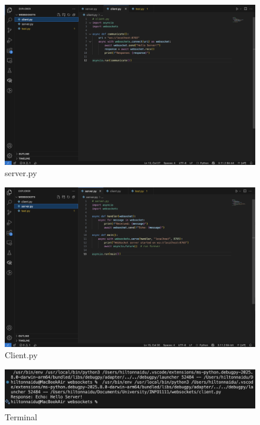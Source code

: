 \documentclass[a4paper, 11pt]{report}
\begin{document}
\begin{figure}[htbp]
\begin{center}
\includegraphics[width=0.95\linewidth]{server.png}
\caption{server.py}
\end{center}
\end{figure}

\begin{figure}[htbp]
\begin{center}
\includegraphics[width=0.95\linewidth]{client.png}
\caption{Client.py}
\end{center}
\end{figure}

\begin{figure}[htbp]
\begin{center}
\includegraphics[width=0.95\linewidth]{terminal.png}
\caption{Terminal}
\end{center}
\end{figure}
\end{document}
